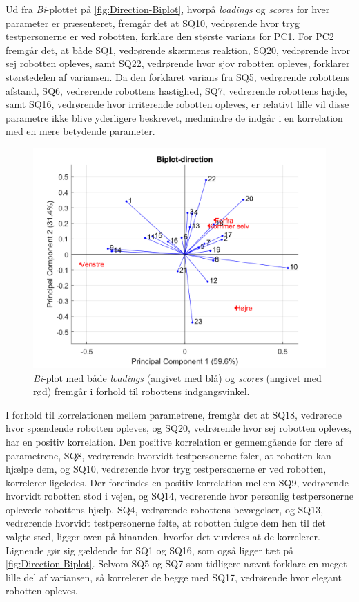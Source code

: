 \noindent
%
Ud fra \textit{Bi}-plottet på \autoref{fig:Direction-Biplot}, hvorpå \textit{loadings} og \textit{scores} for hver parameter er præsenteret, fremgår det at SQ10, vedrørende hvor tryg testpersonerne er ved robotten, forklare den største varians for PC1. For PC2 fremgår det, at både SQ1, vedrørende skærmens reaktion, SQ20, vedrørende hvor sej robotten opleves, samt SQ22, vedrørende hvor sjov robotten opleves, forklarer størstedelen af variansen. Da den forklaret varians fra SQ5, vedrørende robottens afstand, SQ6, vedrørende robottens hastighed, SQ7, vedrørende robottens højde, samt SQ16, vedrørende hvor irriterende robotten opleves, er relativt lille vil disse parametre ikke blive yderligere beskrevet, medmindre de indgår i en korrelation med en mere betydende parameter.  
%
\begin{figure}[H]
\centering
\includegraphics[width=\textwidth]{Figure/DatabehandlingSkalaer/PCAfigures/Direction-Biplot.png}
\caption{\textit{Bi}-plot med både \textit{loadings} (angivet med blå) og \textit{scores} (angivet med rød) fremgår i forhold til robottens indgangsvinkel.}
\label{fig:Direction-Biplot}
\end{figure}
\noindent
%
I forhold til korrelationen mellem parametrene, fremgår det at SQ18, vedrørede hvor spændende robotten opleves, og SQ20, vedrørende hvor sej robotten opleves, har en positiv korrelation. Den positive korrelation er gennemgående for flere af parametrene, SQ8, vedrørende hvorvidt testpersonerne føler, at robotten kan hjælpe dem, og SQ10, vedrørende hvor tryg testpersonerne er ved robotten, korrelerer ligeledes. Der forefindes en positiv korrelation mellem SQ9, vedrørende hvorvidt robotten stod i vejen, og SQ14, vedrørende hvor personlig testpersonerne oplevede robottens hjælp. SQ4, vedrørende robottens bevægelser, og SQ13, vedrørende hvorvidt testpersonerne følte, at robotten fulgte dem hen til det valgte sted, ligger oven på hinanden, hvorfor det vurderes at de korrelerer. Lignende gør sig gældende for SQ1 og SQ16, som også ligger tæt på \autoref{fig:Direction-Biplot}. Selvom SQ5 og SQ7 som tidligere nævnt forklare en meget lille del af variansen, så korrelerer de begge med SQ17, vedrørende hvor elegant robotten opleves.   

